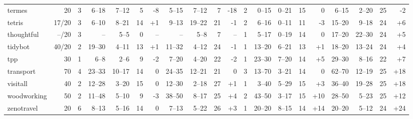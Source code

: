 \documentclass{article}
\begin{document}
\begin{table}[h]
\begin{tabular}{l@{}rr|rrrr|rrrr|r|rrrr|rrrr}
        termes &     20 &   3 &    6--18 &   7--12 &   5 &   {\color{red}-8} &    5--15 &   7--12 &   7 &   {\color{red}-18} &   2 &     0--15 &   0--21 &  15 &                  0 &     6--15 &   2--20 &  25 &    {\color{red}-2} \\
        tetris &  17/20 &   3 &    6--10 &   8--21 &  14 &  {\color{blue}+1} &    9--13 &  19--22 &  21 &    {\color{red}-1} &   2 &     6--16 &   0--11 &  11 &    {\color{red}-3} &    15--20 &   9--18 &  24 &   {\color{blue}+6} \\
    thoughtful &  --/20 &   3 &       -- &    5--5 &   0 &                -- &       -- &    5--8 &   7 &                 -- &   1 &     5--17 &   0--19 &  14 &                  0 &    17--20 &  22--30 &  24 &   {\color{blue}+5} \\
       tidybot &  40/20 &   2 &   19--30 &   4--11 &  13 &  {\color{blue}+1} &   11--32 &   4--12 &  24 &    {\color{red}-1} &   1 &    13--20 &   6--21 &  13 &   {\color{blue}+1} &    18--20 &  13--24 &  24 &   {\color{blue}+4} \\
           tpp &     30 &   1 &     6--8 &    2--6 &   9 &   {\color{red}-2} &    7--20 &   4--20 &  22 &    {\color{red}-2} &   1 &    23--30 &   7--20 &  14 &   {\color{blue}+5} &    29--30 &   8--16 &  22 &   {\color{blue}+7} \\
     transport &     70 &   4 &   23--33 &  10--17 &  14 &                 0 &   24--35 &  12--21 &  21 &                  0 &   3 &    13--70 &   3--21 &  14 &                  0 &    62--70 &  12--19 &  25 &  {\color{blue}+18} \\
      visitall &     40 &   2 &   12--28 &   3--20 &  15 &                 0 &   12--30 &   2--18 &  27 &   {\color{blue}+1} &   1 &     3--40 &   5--29 &  15 &   {\color{blue}+3} &    36--40 &  19--28 &  25 &  {\color{blue}+18} \\
   woodworking &     50 &   2 &   11--48 &   5--10 &   9 &   {\color{red}-3} &   38--50 &   8--17 &  25 &   {\color{blue}+4} &   2 &    43--50 &   3--17 &  15 &  {\color{blue}+10} &    28--50 &   5--23 &  25 &  {\color{blue}+12} \\
    zenotravel &     20 &   6 &    8--13 &   5--16 &  14 &                 0 &    7--13 &   5--22 &  26 &   {\color{blue}+3} &   1 &    20--20 &   8--15 &  14 &  {\color{blue}+14} &    20--20 &   5--12 &  24 &  {\color{blue}+24} \\
\bottomrule
\end{tabular}

                        \end{table}
                        
\end{document}
